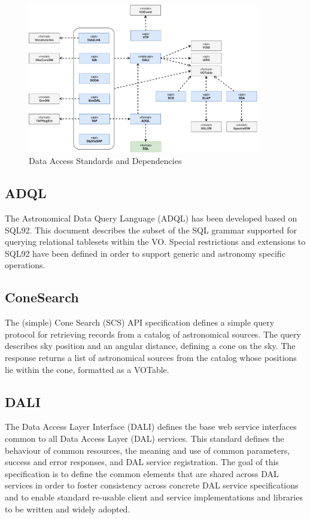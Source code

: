 \documentclass[11pt,letter]{ivoa}
\begin{document}
\begin{figure}[ht]
\centering
\includegraphics[width=0.90\textwidth]{ivoa-arch-dal.pdf}
\caption{Data Access Standards and Dependencies}
\label{fig:daldeps}
\end{figure}


\subsection{ADQL}

The Astronomical Data Query Language (ADQL) \citep{2023ivoa.spec.1215M}
has been developed based on SQL92. This document
describes the subset of the SQL grammar supported for querying
relational tablesets within the VO. Special restrictions and
extensions to SQL92 have been defined in order to support generic and
astronomy
specific operations. 

\subsection{ConeSearch}

The (simple) Cone Search (SCS) \citep{2008ivoa.specQ0222P} API
specification defines a simple query protocol for retrieving
records from a catalog of astronomical sources. The query describes sky
position and an
angular distance, defining a cone on the sky. The response returns a
list of astronomical
sources from the catalog whose positions lie within the cone, formatted
as a VOTable.

\subsection{DALI}
\label{dal:dali}

The Data Access Layer Interface (DALI) \citep{2017ivoa.spec.0517D}
defines the base web service interfaces common to all Data
Access Layer (DAL) services. This standard defines the behaviour of
common resources, the
meaning and use of common parameters, success and error responses, and
DAL service
registration. The goal of this specification is to define the common
elements that are
shared across DAL services in order to foster consistency across
concrete DAL service
specifications and to enable standard re-usable client and service
implementations and
libraries to be written and widely adopted. 
\end{document}
